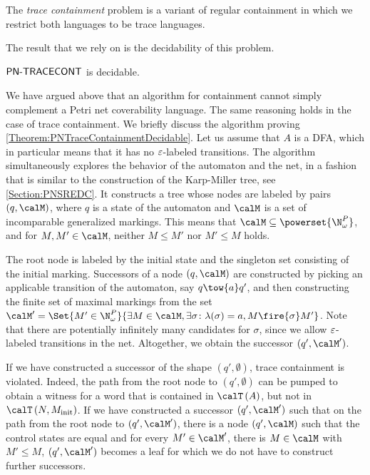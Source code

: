 \documentclass[../../diss.tex]{subfiles}
\begin{document}
The \emph{trace containment} problem is a variant of regular containment in which we restrict both languages to be trace languages.

\begin{problem}
    \problemshort{($\TRACECONT$)}
\end{problem}

The result that we rely on is the decidability of this problem.

\begin{theorem}%
\label{Theorem:PNTraceContainmentDecidable}%
    $\TRACECONT$ is decidable.
\end{theorem}

We have argued above that an algorithm for containment cannot simply complement a Petri net coverability language.
The same reasoning holds in the case of trace containment.
We briefly discuss the algorithm proving \cref{Theorem:PNTraceContainmentDecidable}.
Let us assume that $A$ is a DFA, which in particular means that it has no $\varepsilon$-labeled transitions.
The algorithm simultaneously explores the behavior of the automaton and the net, in a fashion that is similar to the construction of the Karp-Miller tree, see \cref{Section:PNSREDC}.
It constructs a tree whose nodes are labeled by pairs $(q,\calM)$, where $q$ is a state of the automaton and $\calM$ is a set of incomparable generalized markings.
This means that $\calM \subseteq \powerset{\N_\omega^P}$, and for $M,M' \in \calM$, neither $M \leq M'$ nor $M' \leq M$ holds.

The root node is labeled by the initial state and the singleton set consisting of the initial marking.
Successors of a node $(q,\calM)$ are constructed by picking an applicable transition of the automaton, say $q \tow{a} q'$, and then constructing the finite set of maximal markings from the set $\calM' = \Set{ M' \in \N_\omega^P}{ \exists M \in \calM, \exists \sigma \colon \lambda(\sigma) = a, M \fire{\sigma} M'}$.
Note that there are potentially infinitely many candidates for $\sigma$, since we allow $\varepsilon$-labeled transitions in the net.
Altogether, we obtain the successor $(q',\calM')$.

If we have constructed a successor of the shape $(q',  \emptyset)$, trace containment is violated.
Indeed, the path from the root node to $(q',  \emptyset)$ can be pumped to obtain a witness for a word that is contained in $\Traces{A}$, but not in $\Traces{N,\Minit}$.
If we have constructed a successor $(q',\calM')$ such that on the path from the root node to $(q',\calM')$, there is a node $(q',\calM)$ such that the control states are equal and for every $M' \in \calM'$, there is $M \in \calM$ with $M' \leq M$, $(q',\calM')$ becomes a leaf for which we do not have to construct further successors.
\end{document}
